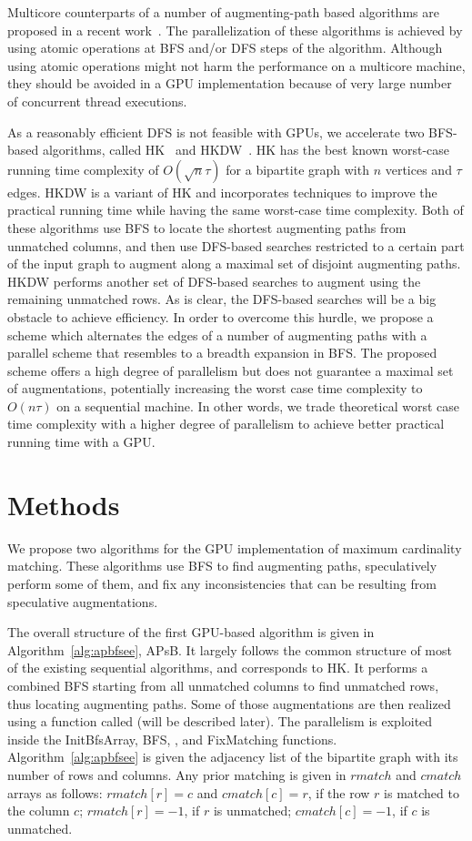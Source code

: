 \documentclass[11pt,a4paper]{article}
\newcommand{\APSBFS}{APsB\xspace}
\newcommand{\fixinconsistent}{{\sc FixMatching}\xspace}
\newcommand{\altswap}{{\sc{Alternate}}\xspace}
\begin{document}
Multicore 
counterparts of a number of augmenting-path based algorithms are proposed in a recent work~\cite{ahrbka:12}. The parallelization 
of these algorithms is achieved by using atomic operations at BFS and/or DFS steps 
of the algorithm. Although using atomic operations might not harm the performance 
on a multicore machine, they should be avoided in a GPU 
implementation because of very large number of concurrent thread executions. 

As a reasonably efficient DFS is not feasible with GPUs, we accelerate two BFS-based algorithms, called HK~\cite{hopcroft1973n} and HKDW~\cite{duwi:88}.
HK has the best known worst-case running time complexity of $O(\sqrt{n}\tau)$ for a bipartite graph with $n$ vertices and $\tau$ edges.
HKDW is a variant of HK and incorporates techniques to improve the practical running time while having the same worst-case time complexity.
Both of these algorithms use BFS to locate the shortest augmenting paths from unmatched columns, 
and then use DFS-based searches restricted to a certain part of the input graph to augment along a maximal set of disjoint augmenting paths.
HKDW performs another set of DFS-based searches to augment using the remaining unmatched rows. 
As is clear, the DFS-based searches will be a big obstacle to achieve efficiency. 
In order to overcome this hurdle, we propose a scheme which alternates the edges of a number of 
augmenting paths with a parallel scheme that resembles to a breadth expansion in BFS. 
The proposed scheme offers a high degree of parallelism but does not guarantee a maximal set of augmentations, potentially increasing the worst case time complexity to  $O(n\tau)$ on a sequential machine. 
In other words, we trade theoretical worst case time complexity with a higher degree of parallelism to achieve better practical running time with a GPU. 

\section{Methods}\label{sec:met}
We propose two algorithms for the GPU implementation of maximum cardinality 
matching. 
These algorithms use BFS to find augmenting paths, speculatively perform some of them, and
fix any inconsistencies that can be resulting from speculative augmentations. 

The overall structure of the first GPU-based algorithm is given in Algorithm~\ref{alg:apbfsee},  \APSBFS.
It largely follows the common structure of most of the existing sequential algorithms, and corresponds to HK. 
It performs a combined BFS starting from all unmatched columns to find unmatched rows, thus locating augmenting paths.
Some of those augmentations are then realized using a function called \altswap (will be described later).
The parallelism is exploited inside the {\sc InitBfsArray}, {\sc BFS}, \altswap, and \fixinconsistent functions. 
Algorithm~\ref{alg:apbfsee} is given the adjacency list 
of the bipartite graph with its number of rows and columns. 
Any prior matching 
is given in $rmatch$ and $cmatch$ arrays as follows: $rmatch[r] = c$ and
$cmatch[c] = r$, if the row $r$ is matched to the column $c$;  
$rmatch[r] = -1$, if $r$ is unmatched; $cmatch[c] = -1$, if $c$ is unmatched.
\end{document}
